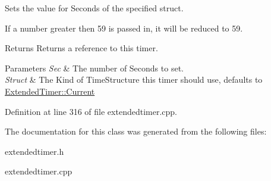 Sets the value for Seconds of the specified struct. 

If a number greater then 59 is passed in, it will be reduced to 59. \begin{DoxyReturn}{Returns}
Returns a reference to this timer. 
\end{DoxyReturn}

\begin{DoxyParams}{Parameters}
{\em Sec} & The number of Seconds to set. \\
\hline
{\em Struct} & The Kind of TimeStructure this timer should use, defaults to \hyperlink{classphys_1_1ExtendedTimer_a0f316e9347d1c118a157cc3c737c554bab42e601e90bdd3d9a40e8bd2203748f4}{ExtendedTimer::Current} \\
\hline
\end{DoxyParams}


Definition at line 316 of file extendedtimer.cpp.



The documentation for this class was generated from the following files:\begin{DoxyCompactItemize}
\item 
extendedtimer.h\item 
extendedtimer.cpp\end{DoxyCompactItemize}
